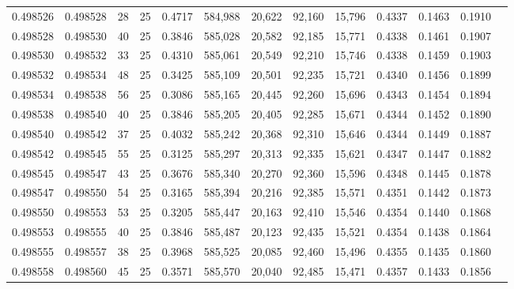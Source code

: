 \begin{tabular}{rrrrrrrrrrrrr}
0.498526 & 0.498528 &    28 &  25 &                                     0.4717 & 584,988 &  20,622 &  92,160 &  15,796 & 0.4337 & 0.1463 & 0.1910 \\
0.498528 & 0.498530 &    40 &  25 &                                     0.3846 & 585,028 &  20,582 &  92,185 &  15,771 & 0.4338 & 0.1461 & 0.1907 \\
0.498530 & 0.498532 &    33 &  25 &                                     0.4310 & 585,061 &  20,549 &  92,210 &  15,746 & 0.4338 & 0.1459 & 0.1903 \\
0.498532 & 0.498534 &    48 &  25 &                                     0.3425 & 585,109 &  20,501 &  92,235 &  15,721 & 0.4340 & 0.1456 & 0.1899 \\
0.498534 & 0.498538 &    56 &  25 &                                     0.3086 & 585,165 &  20,445 &  92,260 &  15,696 & 0.4343 & 0.1454 & 0.1894 \\
0.498538 & 0.498540 &    40 &  25 &                                     0.3846 & 585,205 &  20,405 &  92,285 &  15,671 & 0.4344 & 0.1452 & 0.1890 \\
0.498540 & 0.498542 &    37 &  25 &                                     0.4032 & 585,242 &  20,368 &  92,310 &  15,646 & 0.4344 & 0.1449 & 0.1887 \\
0.498542 & 0.498545 &    55 &  25 &                                     0.3125 & 585,297 &  20,313 &  92,335 &  15,621 & 0.4347 & 0.1447 & 0.1882 \\
0.498545 & 0.498547 &    43 &  25 &                                     0.3676 & 585,340 &  20,270 &  92,360 &  15,596 & 0.4348 & 0.1445 & 0.1878 \\
0.498547 & 0.498550 &    54 &  25 &                                     0.3165 & 585,394 &  20,216 &  92,385 &  15,571 & 0.4351 & 0.1442 & 0.1873 \\
0.498550 & 0.498553 &    53 &  25 &                                     0.3205 & 585,447 &  20,163 &  92,410 &  15,546 & 0.4354 & 0.1440 & 0.1868 \\
0.498553 & 0.498555 &    40 &  25 &                                     0.3846 & 585,487 &  20,123 &  92,435 &  15,521 & 0.4354 & 0.1438 & 0.1864 \\
0.498555 & 0.498557 &    38 &  25 &                                     0.3968 & 585,525 &  20,085 &  92,460 &  15,496 & 0.4355 & 0.1435 & 0.1860 \\
0.498558 & 0.498560 &    45 &  25 &                                     0.3571 & 585,570 &  20,040 &  92,485 &  15,471 & 0.4357 & 0.1433 & 0.1856 \\

\end{tabular}

